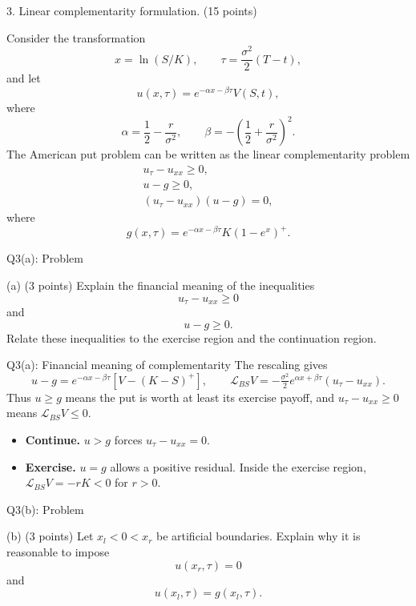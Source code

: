\documentclass{beamer}
\newcommand{\keytext}[1]{\textcolor{lecturekey}{\textbf{#1}}}
\newcommand{\BS}{\mathcal L_{\!BS}}
\begin{document}
\begin{frame}{3. Linear complementarity formulation.}
\footnotesize
\setlength{\abovedisplayskip}{5pt}
\setlength{\belowdisplayskip}{5pt}
\hfill (15 points)\par
Consider the transformation
\[
x=\ln(S/K),\qquad \tau=\frac{\sigma^2}{2}(T-t),
\]
and let
\[
u(x,\tau)=e^{-\alpha x-\beta\tau}V(S,t),
\]
where
\[
\alpha=\frac12-\frac{r}{\sigma^2},\qquad
\beta=-\left(\frac12+\frac{r}{\sigma^2}\right)^2.
\]
The American put problem can be written as the linear complementarity problem
\begin{gather*}
u_\tau-u_{xx}\geq0,\\
u-g\geq0,\\
(u_\tau-u_{xx})(u-g)=0,
\end{gather*}
where
\[
g(x,\tau)=e^{-\alpha x-\beta\tau}K(1-e^x)^+.
\]
\end{frame}

\begin{frame}{Q3(a): Problem}
\footnotesize
\setlength{\abovedisplayskip}{5pt}
\setlength{\belowdisplayskip}{5pt}
\begin{block}{(a) \hfill (3 points)}
Explain the financial meaning of the inequalities
\[
u_\tau-u_{xx}\geq0
\]
and
\[
u-g\geq0.
\]
Relate these inequalities to the exercise region and the continuation region.
\end{block}
\end{frame}

\begin{frame}{Q3(a): Financial meaning of complementarity}
\small
The rescaling gives
\[
u-g=e^{-\alpha x-\beta\tau}[V-(K-S)^+],
\qquad
\BS V=-\tfrac{\sigma^2}{2}e^{\alpha x+\beta\tau}(u_\tau-u_{xx}).
\]
Thus $u\geq g$ means the put is worth at least its exercise payoff,
and $u_\tau-u_{xx}\geq0$ means $\BS V\leq0$.
\begin{itemize}
\item \keytext{Continue.} $u>g$ forces $u_\tau-u_{xx}=0$.
\item \keytext{Exercise.} $u=g$ allows a positive residual. Inside the exercise
region, $\BS V=-rK<0$ for $r>0$.
\end{itemize}
\end{frame}

\begin{frame}{Q3(b): Problem}
\footnotesize
\setlength{\abovedisplayskip}{5pt}
\setlength{\belowdisplayskip}{5pt}
\begin{block}{(b) \hfill (3 points)}
Let $x_l<0<x_r$ be artificial boundaries. Explain why it is reasonable to impose
\[
u(x_r,\tau)=0
\]
and
\[
u(x_l,\tau)=g(x_l,\tau).
\]
\end{block}
\end{frame}
\end{document}

